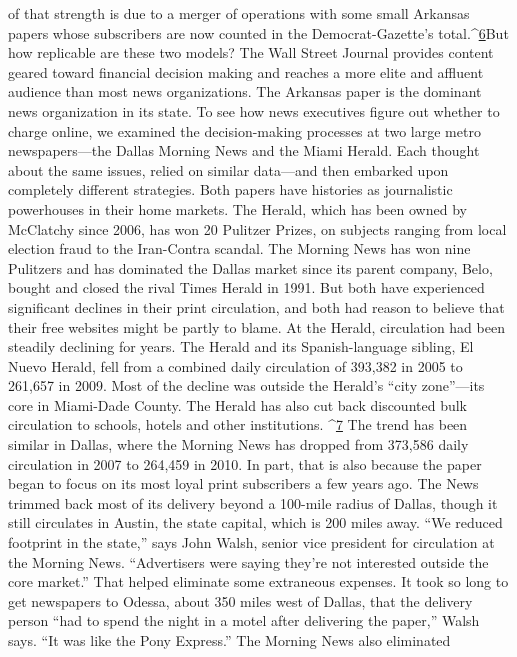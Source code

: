 of that strength is due to a merger of operations with some small Arkansas papers
whose subscribers are now counted in the Democrat-Gazette’s total.^{\href{#endnotes-ch5}{6}}But how replicable are these two models? The Wall Street Journal provides
content geared toward financial decision making and reaches a more elite and
affluent audience than most news organizations. The Arkansas paper is the dominant
news organization in its state.
To see how news executives figure out whether to charge online, we examined
the decision-making processes at two large metro newspapers—the Dallas
Morning News and the Miami Herald. Each thought about the same issues,
relied on similar data—and then embarked upon completely different strategies.
Both papers have histories as journalistic powerhouses in their home markets.
The Herald, which has been owned by McClatchy since 2006, has won 20 Pulitzer
Prizes, on subjects ranging from local election fraud to the Iran-Contra
scandal. The Morning News has won nine Pulitzers and has dominated the Dallas
market since its parent company, Belo, bought and closed the rival Times
Herald in 1991.
But both have experienced significant declines in their print circulation, and
both had reason to believe that their free websites might be partly to blame.
At the Herald, circulation had been steadily declining for years. The Herald and
its Spanish-language sibling, El Nuevo Herald, fell from a combined daily circulation
of 393,382 in 2005 to 261,657 in 2009. Most of the decline was outside
the Herald’s ``city zone''—its core in Miami-Dade County. The Herald has also
cut back discounted bulk circulation to schools, hotels and other institutions. ^{\href{#endnotes-ch5}{7}}%
The trend has been similar in Dallas, where the Morning News has dropped
from 373,586 daily circulation in 2007 to 264,459 in 2010. In part, that is also
because the paper began to focus on its most loyal print subscribers a few years
ago. The News trimmed back most of its delivery beyond a 100-mile radius of
Dallas, though it still circulates in Austin, the state capital, which is 200 miles
away. ``We reduced footprint in the state,'' says John Walsh, senior vice president
for circulation at the Morning News. ``Advertisers were saying they’re not interested
outside the core market.'' That helped eliminate some extraneous expenses.
It took so long to get newspapers to Odessa, about 350 miles west of Dallas, that
the delivery person ``had to spend the night in a motel after delivering the paper,''
Walsh says. ``It was like the Pony Express.'' The Morning News also eliminated
